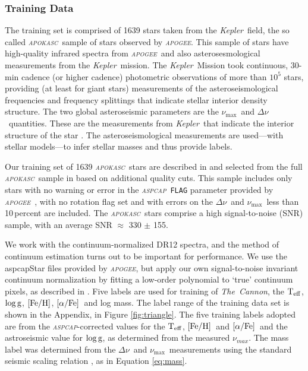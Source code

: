 \documentclass[12pt, preprint]{aastex}
\newcommand{\project}[1]{\textsl{#1}}
\newcommand{\tc}{\project{The~Cannon}}
\newcommand{\apogee}{\project{\textsc{apogee}}}
\newcommand{\apokasc}{\project{\textsc{apokasc}}}
\newcommand{\aspcap}{\project{\textsc{aspcap}}}
\newcommand{\kepler}{\project{Kepler}}
\newcommand{\code}[1]{\texttt{#1}}
\newcommand{\teff}{\mbox{$\rm T_{eff}$}}
\newcommand{\feh}{\mbox{$\rm [Fe/H]$}}
\newcommand{\alphafe}{\mbox{$\rm [\alpha/Fe]$}}
\newcommand{\logg}{\mbox{$\rm \log g$}}
\newcommand{\numax}{$\nu_{\max}$}
\newcommand{\deltanu}{$\Delta\nu$}
\begin{document}
\subsubsection{Training Data} 


 The training set is comprised of 1639 stars taken from the \kepler\ field, the so called \apokasc\ sample \citep{P2014}  of stars observed by \apogee.
This sample of stars have high-quality infrared
spectra from \apogee\ and also asterosesmological measurements from the \kepler\ mission.
The \kepler\ Mission \citep{B2010} took continuous, 30-min cadence (or
higher cadence) photometric observations of more than $10^5$ stars,
providing (at least for giant stars) measurements of the
asteroseismological frequencies and frequency splittings that indicate
stellar interior density structure.
The two global asteroseismic parameters are the \numax\ and \deltanu\ quantities. These are the measurements from \kepler\ that indicate the interior structure of the star \citep[see][and references therein]{P2014}.
The asteroseismological measurements are used---with stellar models---to infer stellar masses and thus provide labels.

Our training set of 1639 \apokasc\ stars are described in \citet{Martig2014} and selected from the full \apokasc\ sample in \citet{P2014} based on additional quality cuts. This sample includes only stars with no warning or error in the \aspcap\ \code{FLAG} parameter provided by \apogee\ \citep{Ahn2014}, with no rotation flag set and with errors on the \deltanu\ and \numax\ less than 10\,percent are included. The \apokasc\ stars comprise a high signal-to-noise (SNR) sample, with an average SNR $\approx$ 330 $\pm$ 155. 

We work with the continuum-normalized DR12 spectra, and the method of continuum
estimation turns out to be important for performance. We use the aspcapStar files provided by \apogee, but apply our own signal-to-noise invariant continuum normalization by fitting a low-order polynomial to `true' continuum pixels, as described in \citet{Ness2015}. 
%
Five labels are used for training of \tc, the \teff, \logg, \feh, \alphafe\ and log mass. The label range of the training data set is shown in the Appendix, in Figure \ref{fig:triangle}. 
 The five training labels adopted are from the \aspcap-corrected values  \citep{Meszaros2013} for the \teff, \feh\ and \alphafe\ and the astroseismic value for \logg, as determined from the measured $\nu_{max}$. The mass label was determined from the  \deltanu\ and \numax\ measurements using the standard seismic scaling relation \citep[e.g.][]{K1995}, as in Equation \ref{eq:mass}. 
\end{document}
